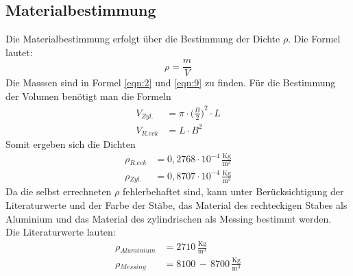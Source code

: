 \subsection{Materialbestimmung}
Die Materialbestimmung erfolgt über die Bestimmung der Dichte $\rho$.
Die Formel lautet:
\begin{equation}
  \rho = \frac{m}{V}
\end{equation}
Die Masssen sind in Formel \ref{eqn:2} und \ref{eqn:9} zu finden.
Für die Bestimmung der Volumen benötigt man die Formeln
\begin{align*}
  V_{Zyl.} &= \pi \cdot {\biggl(\frac{B}{2} \biggr)}^2 \cdot L \\
  V_{R.eck} &= L \cdot B^2
\end{align*}
Somit ergeben sich die Dichten
\begin{align*}
  \rho{_{R.eck}} &=  0,2768 \cdot 10^{-4} \, \mathrm{\frac{Kg}{m^3}} \\
  \rho{_{Zyl.}} &= 0,8707 \cdot 10^{-4} \, \mathrm{\frac{Kg}{m^3}}
\end{align*}
Da die selbst errechneten $\rho$ fehlerbehaftet sind,
kann unter Berücksichtigung der Literaturwerte und der Farbe der Stäbe,
das Material des rechteckigen Stabes als  Aluminium
und das Material des zylindrischen als Messing bestimmt werden.
\\
Die Literaturwerte lauten:
\begin{align*}
\rho{_{Aluminium}} &= 2710 \, \mathrm{\frac{Kg}{m^3}}\\
\rho{_{Messing}} &= 8100 \, - \, 8700 \, \mathrm{\frac{Kg}{m^3}}
\end{align*}

